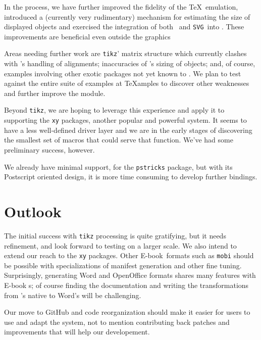 \documentclass{llncs}
\def\ebook{\mbox{E-book}\xspace}
\def\SVG{\texttt{SVG}\xspace}
\begin{document}
In the process, we have further improved the
fidelity of the \TeX\ emulation, introduced
a (currently very rudimentary) mechanism for estimating
the size of displayed objects and exercised the
integration of both \MathML\ and \SVG\ into \HTML.
These improvements are beneficial even outside the graphics

Areas needing further work are \texttt{tikz}' matrix
structure which currently clashes with \LaTeXML's handling
of alignments; inaccuracies of \LaTeXML's sizing of objects;
and, of course, examples involving other exotic packages
not yet known to \LaTeXML.  We plan to test against
the entire suite of examples at TeXamples to discover
other weaknesses and further improve the module.

Beyond \texttt{tikz}, we are hoping to leverage this experience and apply
it to supporting the \texttt{xy} packages, another
popular and powerful system.  It seems to have a less
well-defined driver layer and we are in the early stages of
discovering the smallest set of macros that could serve that
function.  We've had some preliminary success, however.

We already have minimal support, for the \texttt{pstricks}
package, but with its Postscript oriented design,
it is more time consuming to develop further bindings.

\section{Outlook}
The initial success with \texttt{tikz} processing is quite
gratifying, but it needs refinement, and look forward to testing
on a larger scale. We also intend
to extend our reach to the \texttt{xy} packages.
Other \ebook\ formats such as \texttt{mobi} should be possible with
specializations of manifest generation and other fine tuning.
Surprisingly, generating Word and OpenOffice formats shares many features
with \ebook s; of course finding the documentation and writing the \XSLT
transformations from \LaTeXML's native \XML to Word's will be challenging.

Our move to GitHub and code reorganization should make it easier
for users to use and adapt the system, not to mention contributing
back patches and improvements that will help our developement.




\end{document}

